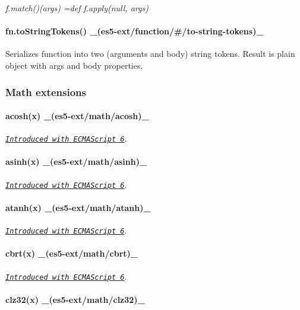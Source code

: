 {\itshape f.\+match()(args) =def f.\+apply(null, args)}

\paragraph*{fn.\+to\+String\+Tokens() \+\_\+(es5-\/ext/function/\#/to-\/string-\/tokens)\+\_\+}

Serializes function into two (arguments and body) string tokens. Result is plain object with {\ttfamily args} and {\ttfamily body} properties.

\subsubsection*{Math extensions}

\paragraph*{acosh(x) \+\_\+(es5-\/ext/math/acosh)\+\_\+}

\href{http://people.mozilla.org/~jorendorff/es6-draft.html#sec-math.acosh}{\tt {\itshape Introduced with E\+C\+M\+A\+Script 6}}. ~\newline
 \paragraph*{asinh(x) \+\_\+(es5-\/ext/math/asinh)\+\_\+}

\href{http://people.mozilla.org/~jorendorff/es6-draft.html#sec-math.asinh}{\tt {\itshape Introduced with E\+C\+M\+A\+Script 6}}. ~\newline
 \paragraph*{atanh(x) \+\_\+(es5-\/ext/math/atanh)\+\_\+}

\href{http://people.mozilla.org/~jorendorff/es6-draft.html#sec-math.atanh}{\tt {\itshape Introduced with E\+C\+M\+A\+Script 6}}. ~\newline
 \paragraph*{cbrt(x) \+\_\+(es5-\/ext/math/cbrt)\+\_\+}

\href{http://people.mozilla.org/~jorendorff/es6-draft.html#sec-math.cbrt}{\tt {\itshape Introduced with E\+C\+M\+A\+Script 6}}. ~\newline
 \paragraph*{clz32(x) \+\_\+(es5-\/ext/math/clz32)\+\_\+}

